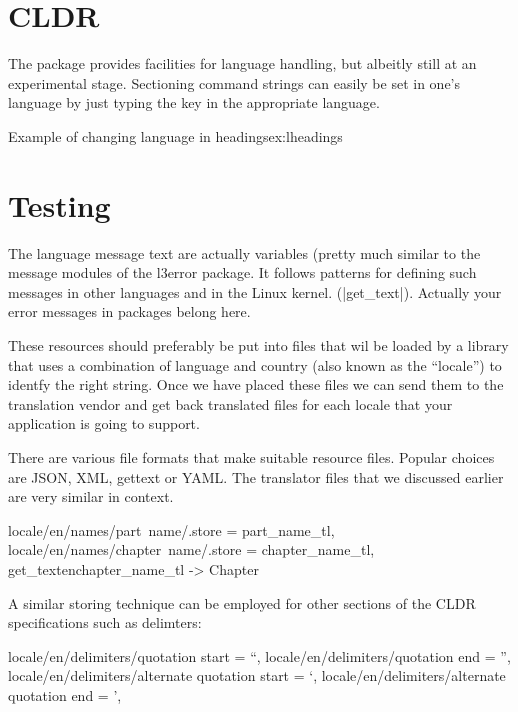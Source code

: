 \chapter{CLDR}

The  package provides facilities for language handling, but albeitly still at an experimental stage. Sectioning command strings can easily be set in one's language by just typing the key in the appropriate language.

\begin{texexample}{Example of changing language in headings}{ex:lheadings}
\bgroup
{}
\chapter{Testing}
        
\egroup
\end{texexample}


The language message text are actually variables (pretty much similar to the message modules of the l3error package. It follows
patterns for defining such messages in other languages and in the Linux kernel. (|get_text|). Actually your error messages
in packages belong here. 

These resources should preferably be put into files that wil be loaded by a library that uses a combination of language and country (also known as the \enquote{locale}) to identfy the right string. Once we have placed these files we can send them to the translation vendor and get back translated files for each locale that your application is going to support.

There are various file formats that make suitable resource files. Popular choices are JSON, XML, gettext or YAML. The translator files that we discussed earlier are very similar in context. 

\begin{phdverbatim}     
     locale/en/names/part~name/.store      = part_name_tl,
     locale/en/names/chapter~name/.store   = chapter_name_tl,
     get_text{en}{chapter_name_tl} -> Chapter
\end{phdverbatim} 

A similar storing technique can be employed for other sections of the CLDR specifications such as delimters:

\begin{phdverbatim}
    locale/en/delimiters/quotation start = “,
    locale/en/delimiters/quotation end =  ”,
    locale/en/delimiters/alternate quotation start = ‘,
    locale/en/delimiters/alternate quotation end = ’,
\end{phdverbatim}

